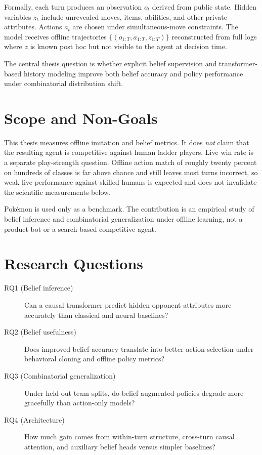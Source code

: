 Formally, each turn produces an observation $o_t$ derived from public state.
Hidden variables $z_t$ include unrevealed moves, items, abilities, and
other private attributes. Actions $a_t$ are chosen under simultaneous-move
constraints. The model receives offline trajectories
$\{(o_{1:T}, a_{1:T}, z_{1:T})\}$ reconstructed from full logs where $z$ is
known post hoc but not visible to the agent at decision time.

The central thesis question is whether explicit belief supervision and
transformer-based history modeling improve both belief accuracy and policy
performance under combinatorial distribution shift.

\section{Scope and Non-Goals}

This thesis measures offline imitation and belief metrics. It does
\emph{not} claim that the resulting agent is competitive against human ladder
players. Live win rate is a separate play-strength question. Offline action
match of roughly twenty percent on hundreds of classes is far above chance and
still leaves most turns incorrect, so weak live performance against skilled
humans is expected and does not invalidate the scientific measurements below.

Pok\'emon is used only as a benchmark. The contribution is an empirical study of
belief inference and combinatorial generalization under offline learning, not a
product bot or a search-based competitive agent.

\section{Research Questions}

\begin{description}
  \item[RQ1 (Belief inference)] Can a causal transformer predict hidden opponent
    attributes more accurately than classical and neural baselines?
  \item[RQ2 (Belief usefulness)] Does improved belief accuracy translate into
    better action selection under behavioral cloning and offline policy metrics?
  \item[RQ3 (Combinatorial generalization)] Under held-out team splits,
    do belief-augmented policies degrade more gracefully than action-only models?
  \item[RQ4 (Architecture)] How much gain comes from within-turn structure,
    cross-turn causal attention, and auxiliary belief heads versus simpler
    baselines?
\end{description}

